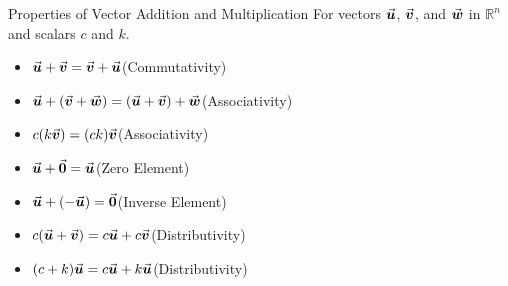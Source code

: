 \documentclass{beamer}
\begin{document}
\begin{frame}
\begin{block}{Properties of Vector Addition and Multiplication}
For vectors $\vect{u}$, $\vect{v}$, and $\vect{w}$ in $\mathbb{R}^n$ and scalars $c$ and $k$.\begin{itemize}
\item $\vect{u}+\vect{v}=\vect{v}+\vect{u}$\hfill(Commutativity)
\item $\vect{u}+(\vect{v}+\vect{w})=(\vect{u}+\vect{v})+\vect{w}$\hfill(Associativity)
\item $c(k\vect{v})=(ck)\vect{v}$\hfill(Associativity)
\item $\vect{u}+\vect{0}=\vect{u}$\hfill(Zero Element)
\item $\vect{u}+(-\vect{u})=\vect{0}$\hfill(Inverse Element)
\item $c(\vect{u}+\vect{v})=c\vect{u}+c\vect{v}$\hfill(Distributivity)
\item $(c+k)\vect{u}=c\vect{u}+k\vect{u}$\hfill(Distributivity)
\end{itemize}
\end{block}
\end{frame}
\end{document}
